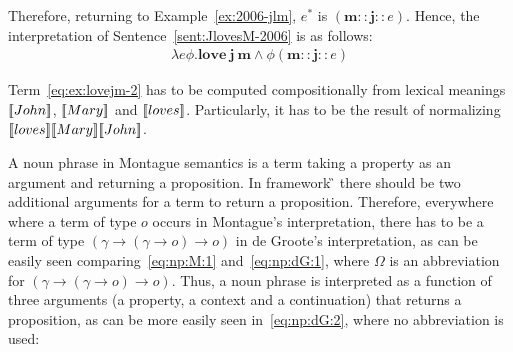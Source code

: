 Therefore, returning to Example~\ref{ex:2006-jlm}, $e^*$ is $(\textbf{m} :: \textbf{j} ::{e})$. Hence, the interpretation of Sentence~\eqref{sent:JlovesM-2006} is as follows:
\begin{align}
\lambda e \phi. \textbf{love}  \ \textbf{j} \ \textbf{m} \land \phi (\textbf{m} :: \textbf{j} ::{e}) \label{eq:ex:lovejm-2}
\end{align}

Term~\eqref{eq:ex:lovejm-2} has to be computed compositionally from lexical meanings $[\![John]\!]$, $[\![Mary]\!]$ and $[\![loves]\!]$. Particularly, it has to be the result of normalizing  $[\![loves]\!] [\![Mary]\!] [\![John]\!]$.

A noun phrase in Montague semantics is a term taking a property as an argument and returning a proposition.  In framework {\G} there should be two additional arguments for a term to return a proposition. Therefore, everywhere where a term of type $o$ occurs in Montague's interpretation, there has to be a term of type $(\gamma \rightarrow (\gamma \rightarrow o) \rightarrow o)$ in de Groote's interpretation, as can be easily seen comparing~\eqref{eq:np:M:1} and~\eqref{eq:np:dG:1}, where $\Omega$ is an abbreviation for $(\gamma \rightarrow (\gamma \rightarrow o) \rightarrow o)$. Thus, a noun phrase is interpreted as a function of three arguments (a property, a context and a continuation) that returns a proposition, as can be more easily seen in~\eqref{eq:np:dG:2}, where no abbreviation is used:
